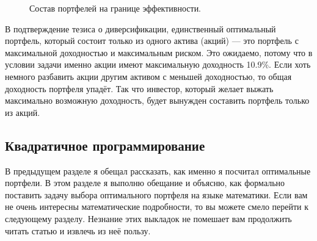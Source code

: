 \begin{figure}[ht]
\centering
{}

\caption{Состав портфелей на границе эффективности.}
\label{efficient_frontier_allocation}
\end{figure}

В подтверждение тезиса о диверсификации, единственный оптимальный портфель, 
который состоит только из одного актива (акций) --- это портфель с максимальной 
доходностью и максимальным риском. Это ожидаемо, потому что в условии задачи 
именно акции имеют максимальную доходность 10.9\%. Если хоть немного разбавить 
акции другим активом с меньшей доходностью, то общая доходность портфеля упадёт. 
Так что инвестор, который желает выжать максимально возможную доходность, будет 
вынужден составить портфель только из акций.

\subsection{Квадратичное программирование}

В предыдущем разделе я обещал рассказать, как именно я посчитал оптимальные 
портфели. В этом разделе я выполню обещание и объясню, как формально поставить 
задачу выбора оптимального портфеля на языке математики. Если вам не очень 
интересны математические подробности, то вы можете смело перейти к следующему 
разделу. Незнание этих выкладок не помешает вам продолжить читать статью и 
извлечь из неё пользу.

